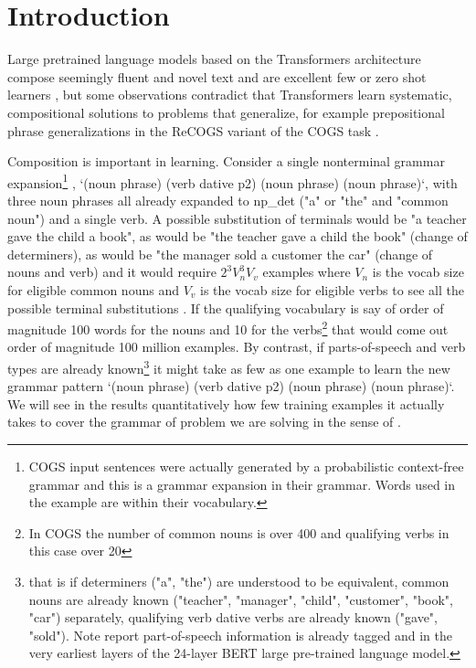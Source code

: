 \documentclass[11pt]{article}
\begin{document}
\section{Introduction}
Large pretrained language models based on the Transformers architecture compose seemingly fluent and novel text and are excellent few or zero shot learners \cite{Brown2020}, but some observations contradict that Transformers learn systematic, compositional solutions to problems that generalize, for example prepositional phrase generalizations in the ReCOGS \cite{Wu2023} variant of the COGS task \cite{KimLinzen2020}.

Composition is important in learning. Consider a single nonterminal grammar expansion\footnote{COGS input sentences were actually generated by a probabilistic context-free grammar and this is a grammar expansion in their grammar. Words used in the example are within their vocabulary.} , `(noun phrase) (verb dative p2) (noun phrase) (noun phrase)`, with three noun phrases all already expanded to np\_det ("a" or "the" and "common noun") and a single verb. A possible substitution of terminals would be "a teacher gave the child a book", as would be "the teacher gave a child the book" (change of determiners), as would be "the manager sold a customer the car" (change of nouns and verb) and it would require $2^3 V_n^3V_v $ examples where $V_n$ is the vocab size for eligible common nouns and $V_v$ is the vocab size for eligible verbs to see all the possible terminal substitutions . If the qualifying vocabulary is say of order of magnitude 100 words for the nouns and 10 for the verbs\footnote{In COGS the number of common nouns is over 400 and qualifying verbs in this case over 20} that would come out order of magnitude 100 million examples. By contrast, if parts-of-speech and verb types are already known\footnote{that is if determiners ("a", "the") are understood to be equivalent, common nouns are already known ("teacher", "manager", "child", "customer", "book", "car") separately, qualifying verb dative verbs are already known ("gave", "sold"). Note \cite{tenney2019bertrediscoversclassicalnlp} report part-of-speech information is already tagged and in the very earliest layers of the 24-layer BERT large pre-trained language model.} it might take as few as one example to learn the new grammar pattern `(noun phrase) (verb dative p2) (noun phrase) (noun phrase)`. We will see in the results quantitatively how few training examples it actually takes to cover the grammar of problem we are solving in the sense of \cite{fuzzingbook2023:GrammarCoverageFuzzer}.
\end{document}

